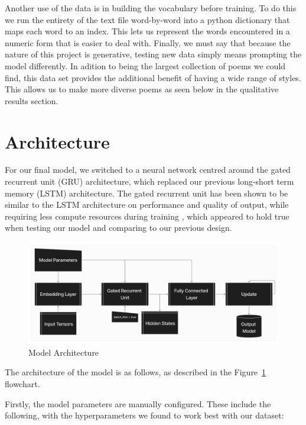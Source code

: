 \documentclass{article} %
\begin{document}
Another use of the data is in building the vocabulary before training.
To do this we run the entirety of the text file word-by-word into a python dictionary that maps each word to an index.
This lets us represent the words encountered in a numeric form that is easier to deal with.
Finally, we must say that because the nature of this project is generative,
testing new data simply means prompting the model differently.
In adition to being the largest collection of poems we could find,
this data set provides the additional benefit of having a wide range of styles.
This allows us to make more diverse poems as seen below in the qualitative results section.

\section{Architecture}

For our final model, we switched to a neural network centred around the gated recurrent unit (GRU) architecture, which replaced our previous long-short term memory (LSTM) architecture. 
The gated recurrent unit has been shown to be similar to the LSTM architecture on performance and quality of output, while requiring less compute resources during training \citep{LSTMvGRU}, which
appeared to hold true when testing our model and comparing to our previous design. 


\begin{figure}[h]
  \begin{center}
  \includegraphics[width=1\textwidth]{Figs/Haiku-Generation.png}
  \end{center}
  \caption{Model Architecture}
  \label{fig:flowchart}
\end{figure}

The architecture of the model is as follows, as described in the Figure~\ref{fig:flowchart} flowchart.

Firstly, the model parameters are manually configured. These include the following, with the hyperparameters we found to work best with our dataset:
\end{document}
